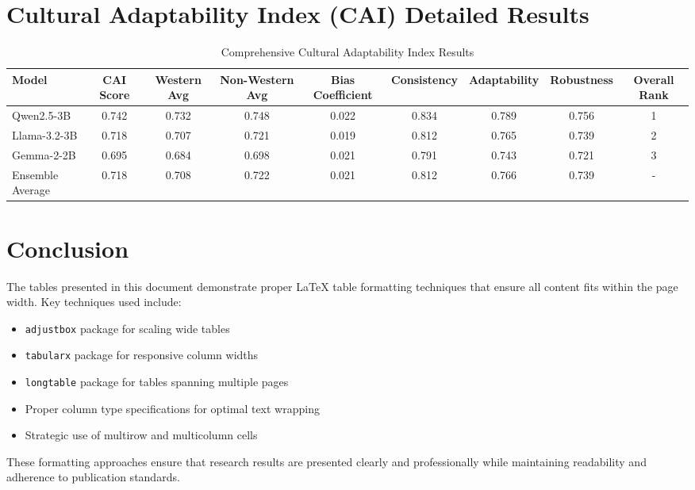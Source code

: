 \documentclass[11pt,a4paper]{article}
\begin{document}
\section{Cultural Adaptability Index (CAI) Detailed Results}

\begin{table}[htbp]
\centering
\begin{adjustbox}{width=\textwidth}
\begin{tabular}{|l|c|c|c|c|c|c|c|c|}
\hline
\textbf{Model} & \textbf{CAI Score} & \textbf{Western Avg} & \textbf{Non-Western Avg} & \textbf{Bias Coefficient} & \textbf{Consistency} & \textbf{Adaptability} & \textbf{Robustness} & \textbf{Overall Rank} \\
\hline
Qwen2.5-3B & 0.742 & 0.732 & 0.748 & 0.022 & 0.834 & 0.789 & 0.756 & 1 \\
\hline
Llama-3.2-3B & 0.718 & 0.707 & 0.721 & 0.019 & 0.812 & 0.765 & 0.739 & 2 \\
\hline
Gemma-2-2B & 0.695 & 0.684 & 0.698 & 0.021 & 0.791 & 0.743 & 0.721 & 3 \\
\hline
Ensemble Average & 0.718 & 0.708 & 0.722 & 0.021 & 0.812 & 0.766 & 0.739 & - \\
\hline
\end{tabular}
\end{adjustbox}
\caption{Comprehensive Cultural Adaptability Index Results}
\label{tab:cai_detailed}
\end{table}

\section{Conclusion}

The tables presented in this document demonstrate proper LaTeX table formatting techniques that ensure all content fits within the page width. Key techniques used include:

\begin{itemize}
\item \texttt{adjustbox} package for scaling wide tables
\item \texttt{tabularx} package for responsive column widths
\item \texttt{longtable} package for tables spanning multiple pages
\item Proper column type specifications for optimal text wrapping
\item Strategic use of multirow and multicolumn cells
\end{itemize}

These formatting approaches ensure that research results are presented clearly and professionally while maintaining readability and adherence to publication standards.
\end{document}
